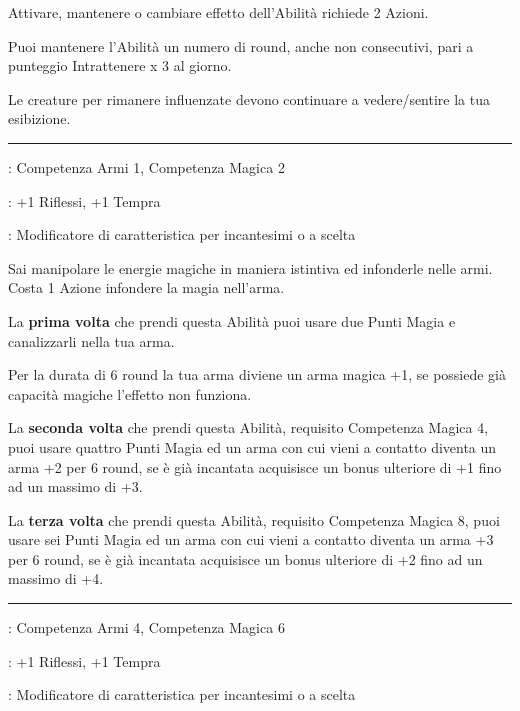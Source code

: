 \begin{multicols}{2}
Attivare, mantenere o cambiare effetto dell'Abilità richiede 2 Azioni.

Puoi mantenere l'Abilità un numero di round, anche non consecutivi, pari a punteggio Intrattenere x 3 al giorno.

Le creature per rimanere influenzate devono continuare a vedere/sentire la tua esibizione.

\smallskip\noindent\rule{\linewidth}{2pt} \hypertarget{Infondere Energia Magica}{}\medskip{}
\noindent
\begin{description}[noitemsep, topsep=0pt, parsep=0pt, partopsep=0pt, leftmargin=0cm, labelwidth=2.5cm]
    \item[\textbf{Requisito}]: Competenza Armi 1, Competenza Magica 2
    \item[\textbf{Tiri Salvezza}]: +1 Riflessi, +1 Tempra
    \item[\textbf{Caratteristica}]: Modificatore di caratteristica per incantesimi o a scelta
\end{description}

Sai manipolare le energie magiche in maniera istintiva ed infonderle nelle armi. Costa 1 Azione infondere la magia nell'arma.

La \textbf{prima volta} che prendi questa Abilità puoi usare due Punti Magia e canalizzarli nella tua arma.

Per la durata di 6 round la tua arma diviene un arma magica +1, se possiede già capacità magiche l'effetto non funziona.

La \textbf{seconda volta} che prendi questa Abilità, requisito Competenza Magica 4, puoi usare quattro Punti Magia ed un arma con cui vieni a contatto diventa un arma +2 per 6 round, se è già incantata acquisisce un bonus ulteriore di +1 fino ad un massimo di +3.

La \textbf{terza volta} che prendi questa Abilità, requisito Competenza Magica 8, puoi usare sei Punti Magia ed un arma con cui vieni a contatto diventa un arma +3 per 6 round, se è già incantata acquisisce un bonus ulteriore di +2 fino ad un massimo di +4.

\smallskip\noindent\rule{\linewidth}{2pt} \hypertarget{Infondere Energia Magica Superiore}{}\medskip{}
\noindent
\begin{description}[noitemsep, topsep=0pt, parsep=0pt, partopsep=0pt, leftmargin=0cm, labelwidth=2.5cm]
    \item[\textbf{Requisito}]: Competenza Armi 4, Competenza Magica 6
    \item[\textbf{Tiri Salvezza}]: +1 Riflessi, +1 Tempra
    \item[\textbf{Caratteristica}]: Modificatore di caratteristica per incantesimi o a scelta
\end{description}


\end{multicols}
